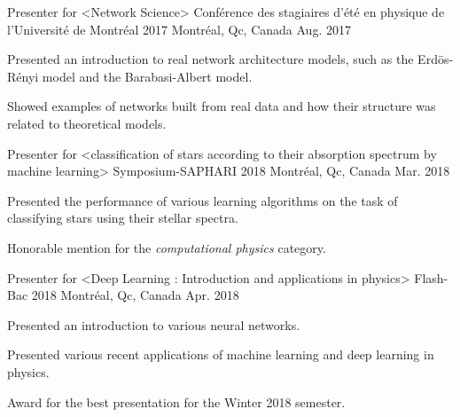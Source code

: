 \begin{cventries}
  \cventry
    {Presenter for <Network Science>}
    {Conférence des stagiaires d'été en physique de l'Université de Montréal 2017}
    {Montréal, Qc, Canada}
    {Aug. 2017}
    {
      \begin{cvitems}
        \item {Presented an introduction to real network architecture models, such as the Erdös-Rényi model and the Barabasi-Albert model.}
        \item {Showed examples of networks built from real data and how their structure was related to theoretical models.}
      \end{cvitems}
    }
  \cventry
    {Presenter for <classification of stars according to their absorption spectrum by machine learning>}
    {Symposium-SAPHARI 2018}
    {Montréal, Qc, Canada}
    {Mar. 2018}
    {
      \begin{cvitems}
      	\item {Presented the performance of various learning algorithms on the task of classifying stars using their stellar spectra.}
		\item {Honorable mention for the \textit{computational physics} category.}
      \end{cvitems}
    }
  \cventry
    {Presenter for <Deep Learning : Introduction and applications in physics>}
    {Flash-Bac 2018}
    {Montréal, Qc, Canada}
    {Apr. 2018}
    {
      \begin{cvitems}
        \item {Presented an introduction to various neural networks.}
        \item {Presented various recent applications of machine learning and deep learning in physics.}
        \item {Award for the best presentation for the Winter 2018 semester.}
      \end{cvitems}
    }
\end{cventries}
